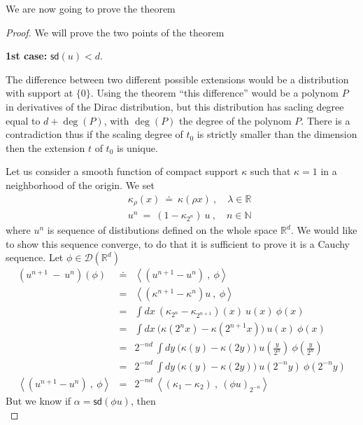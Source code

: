 \documentclass[10pt]{book}
\newcommand{\sd}{\mathsf{sd}}
\newcommand{\sm}[1]{\left\langle#1\right\rangle}
\let\int\int
\newcommand{\Dcal}{\mathcal{D}}
\newcommand{\Nbb}{\mathbb{N}}
\newcommand{\Rbb}{\mathbb{R}}
\theoremstyle{break}
\begin{document}
We are now going to prove the theorem 

\begin{proof}
 We will prove the two points of the theorem 
 \begin{center}
  \textbf{1st case:} $\sd(u)<d$.
 \end{center}
 The difference between two different possible extensions would be a distribution with support at $\{0\}$. Using the theorem  ``this difference'' would be a polynom $P$ in derivatives of the Dirac distribution, but this distribution has sacling degree equal to $d+\deg(P)$, with $\deg(P)$ the degree of the polynom $P$. There is a contradiction thus if the scaling degree of $t_0$ is strictly smaller than the dimension then the extension $t$ of $t_0$ is unique.\par
 Let us consider a smooth function of compact support $\kappa$ such that $\kappa=1$ in a neighborhood of the origin. We set
 \begin{eqnarray*}
  && \kappa_\rho(x) \ \doteq \ \kappa(\rho x) \ , \quad \lambda \in \Rbb \\
  && u^n \ = \ (1-\kappa_{2^n}) \ u \ , \quad n \in \Nbb
 \end{eqnarray*}
 where $u^n$ is sequence of distibutions defined on the whole space $\Rbb^d$. We would like to show this sequence converge, to do that it is sufficient to prove it is a Cauchy sequence. Let $\phi \in \Dcal(\Rbb^d)$ 
 \begin{eqnarray*}
  \left( u^{n+1} \ - \ u^n \right)(\phi) &\doteq& \sm{\left(u^{n+1} - u^n\right) \ , \ \phi} \\
  &=& \sm{\left(\kappa^{n+1} - \kappa^n\right) u \ , \ \phi} \\
  &=& \int dx \ \left(\kappa_{2^n} - \kappa_{2^{n+1}}\right)(x) \ u(x) \ \phi(x) \\
  &=& \int dx \ \bigg(\kappa(2^n x) - \kappa(2^{n+1} x)\bigg) \ u(x) \ \phi(x) \\
  &=& 2^{-nd} \ \int dy \ \bigg(\kappa(y) - \kappa(2 y)\bigg) \ u\left(\frac{y}{2^n}\right) \ \phi\left(\frac{y}{2^n}\right) \\ 
  &=& 2^{-nd} \ \int dy \ \bigg(\kappa(y) - \kappa(2 y)\bigg) \ u\left(2^{-n} y \right) \ \phi\left(2^{-n} y\right) \\
  \sm{\left(u^{n+1} - u^n\right) \ , \ \phi} &=& 2^{-nd} \ \sm{\left(\kappa_1 - \kappa_2\right) \ , \ (\phi u)_{2^{-n}} }
 \end{eqnarray*}
 But we know if $\alpha = \sd(\phi u)$, then 
 \begin{equation*}

\end{equation*}
\end{proof}
\end{document}
